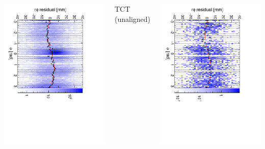 \documentclass[compress]{beamer}
\begin{document}
\begin{frame}
\begin{columns}
\includegraphics[height=\linewidth, angle=90]{diskiter01_p2to1inner.pdf}

\centering TCT (unaligned)

\includegraphics[height=\linewidth, angle=90]{diskiter01_p2to1inner_TST.pdf}
\end{columns}


\end{frame}
\end{document}
